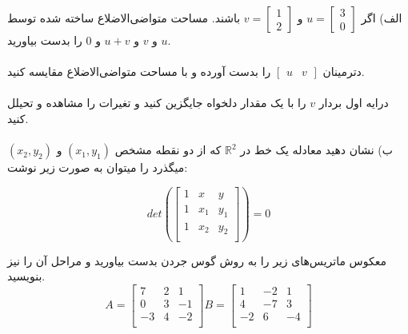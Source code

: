 \documentclass{article}
\begin{document}
\clearpage



الف) اگر $u = \begin{bmatrix}3 \\ 0\end{bmatrix}$ و $v = \begin{bmatrix}1\\ 2 \end{bmatrix}$ باشند. مساحت متواضی‌الاضلاع ساخته شده توسط $u$ و $v$ و $u + v$ و $0$ را بدست بیاورید.
\\\\
دترمینان $\begin{bmatrix}u & v\end{bmatrix}$ را بدست آورده و با مساحت متواضی‌الاضلاع مقایسه کنید. 
\\\\
درایه اول بردار $v$ را با یک مقدار دلخواه جایگزین کنید و تغیرات را مشاهده و تحیلل کنید.
\\\\
ب) نشان دهید معادله یک خط در ${\mathbb R}^2$ که از دو نقطه مشخص
$(x_1, y_1)$ و $(x_2, y_2)$میگذرد را میتوان به صورت زیر نوشت:

\[det(
\begin{bmatrix}
    1       & x        & y \\
    1       & x_1      & y_1 \\
    1       & x_2      & y_2 \\
\end{bmatrix}
)=0\]



معکوس ماتریس‌های زیر را به روش گوس جردن بدست بیاورید و مراحل آن را نیز بنویسید.
\\
\[A=
\begin{bmatrix}
    7       & 2      & 1 \\
    0       & 3      & -1 \\
    -3      & 4      & -2 \\
\end{bmatrix}
B=
\begin{bmatrix}
    1       & -2     & 1 \\
    4       & -7     & 3 \\
    -2      & 6      & -4 \\
\end{bmatrix}
\]

\end{document}
